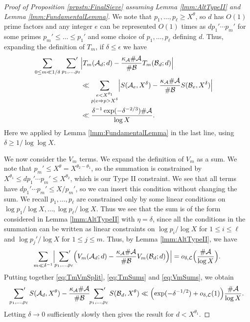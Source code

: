 \documentclass[10pt]{amsart}
\theoremstyle{plain}
\numberwithin{sblmm}{thrm}
\numberwithin{equation}{section}
\begin{document}
\begin{proof}[Proof of Proposition \ref{prpstn:FinalSieve} assuming Lemma \ref{lmm:AltTypeII} and Lemma \ref{lmm:FundamentalLemma}]
We note that $p_1,\dots,p_\ell\ge X^\theta$, so $d$ has $O(1)$ prime factors and any integer $e$ can be represented $O(1)$ times as $d p_1'\cdots p_m'$ for some primes $p_m'\le\dots \le p_1'$ and some choice of $p_1,\dots,p_\ell$ defining $d$. Thus, expanding the definition of $T_m$, if $\delta\le \epsilon$ we have
%
\begin{align}
\sum_{0\le m\ll 1/\delta}\,\sideset{}{'}\sum_{p_1,\dots,p_\ell}&\Bigl|T_m(\mathcal{A}{}_{d};d)-\frac{\kappa_\mathcal{A}\#\mathcal{A}{}}{\#\mathcal{B}{}} T_m(\mathcal{B}{}_d;d)\Bigr|\nonumber\\
&\ll \sum_{\substack{e<X^{\theta_1}\\ p|e\Rightarrow p>X^{\delta} }}\Bigl|S(\mathcal{A}{}_{e}, X^{\delta})-\frac{\kappa_\mathcal{A}\#\mathcal{A}{}}{\#\mathcal{B}{}}S(\mathcal{B}{}_e,X^{\delta})\Bigr|&\nonumber\\
&\ll \frac{\delta^{-1}\exp(-\delta^{-2/3})\#\mathcal{A}}{\log{X}}.
\label{eq:TmSums}
\end{align}
%
Here we applied by Lemma \ref{lmm:FundamentalLemma} in the last line, using $\delta\ge 1/\log\log{X}$.

We now consider the $V_m$ terms. We expand the definition of $V_m$ as a sum. We note that $p_m'\le X^\theta=X^{\theta_2-\theta_1}$, so the summation is constrained by $X^{\theta_1}\le d p_1'\cdots p_m'\le X^{\theta_2}$, which is our Type II constraint. We see that all terms have $d p_1'\cdots p_m'\le X/p_m'$, so we can insert this condition without changing the sum. We recall $p_1,\dots,p_\ell$ are constrained only by some linear conditions on $\log{p_1}/\log{X},\dots,\log{p_\ell}/\log{X}$. Thus we see that the sum is of the form considered in Lemma \ref{lmm:AltTypeII} with $\eta=\delta$, since all the conditions in the summation can be written as linear constraints on $\log{p_i}/\log{X}$ for $1\le i \le \ell$ and $\log{p_j'}/\log{X}$ for $1\le j\le m$. Thus, by Lemma \ref{lmm:AltTypeII}, we have
%
%
\begin{equation}
\sum_{m\ll \delta^{-1}}\Bigl|\sideset{}{'}\sum_{p_1,\dots,p_\ell}\Bigl(V_m(\mathcal{A}{}_d;d)-\frac{\kappa_\mathcal{A}\#\mathcal{A}{}}{\#\mathcal{B}{}} V_m(\mathcal{B}_d;d)\Bigr)\Bigr|=o_{\delta,\mathcal{L}}\Bigl(\frac{\#\mathcal{A}}{\log{X}}\Bigr).
\label{eq:VmSums}
\end{equation}
%
Putting together \eqref{eq:TmVmSplit}, \eqref{eq:TmSums} and \eqref{eq:VmSums}, we obtain
\[
\sideset{}{'}\sum_{p_1,\dots,p_\ell} S(\mathcal{A}{}_{d},X^{\theta})-\frac{\kappa_\mathcal{A}\#\mathcal{A}{}}{\#\mathcal{B}{}} \sideset{}{'}\sum_{p_1,\dots,p_\ell} S(\mathcal{B}{}_{d},X^{\theta})\ll \Bigl(\exp(-\delta^{-1/2})+o_{\delta,\mathcal{L}}(1)\Bigr)\frac{\#\mathcal{A}}{\log{X}}.
\]
Letting $\delta\rightarrow 0$ sufficiently slowly then gives the result for $d<X^{\theta_1}$.


\end{proof}
\end{document}
